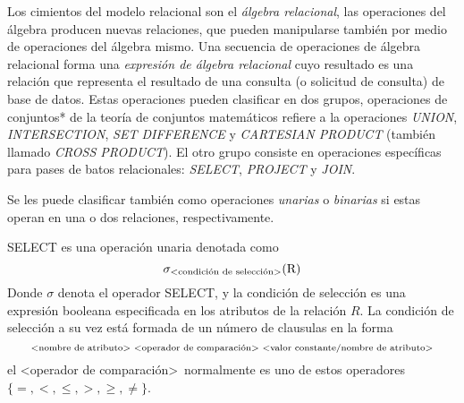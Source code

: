 Los cimientos del modelo relacional son el \emph{álgebra relacional}, las operaciones del álgebra producen nuevas relaciones, que pueden manipularse también por medio de operaciones del álgebra mismo. Una secuencia de operaciones de álgebra relacional forma una \emph{expresión de álgebra relacional} cuyo resultado es una relación que representa el resultado de una consulta (o solicitud de consulta) de base de datos. Estas operaciones pueden clasificar en dos grupos, operaciones de conjuntos* de la teoría de conjuntos matemáticos refiere a la operaciones \emph{UNION}, \emph{INTERSECTION}, \emph{SET DIFFERENCE} y \emph{CARTESIAN PRODUCT} (también llamado \emph{CROSS PRODUCT}). El otro grupo consiste en operaciones específicas para pases de batos relacionales: \emph{SELECT}, \emph{PROJECT} y \emph{JOIN}.

Se les puede clasificar también como operaciones \emph{unarias} o \emph{binarias} si estas operan en una o dos relaciones, respectivamente.

SELECT es una operación unaria denotada como
\begin{equation}
\sigma_\text{\textless condición de selección\textgreater}{\text{(R)}}
\end{equation}
Donde $\sigma$ denota el operador SELECT, y la condición de selección es una expresión booleana especificada en los atributos de la relación $R$. La condición de selección a su vez está formada de un número de clausulas en la forma
\begin{equation}
_\text{\textless nombre de atributo\textgreater\ \textless operador de comparación\textgreater\ \textless valor constante/nombre de atributo\textgreater}
\end{equation}
el \textless operador de comparación\textgreater\ normalmente es uno de estos operadores $\{=,<,\leq,>,\geq,\neq\}$.